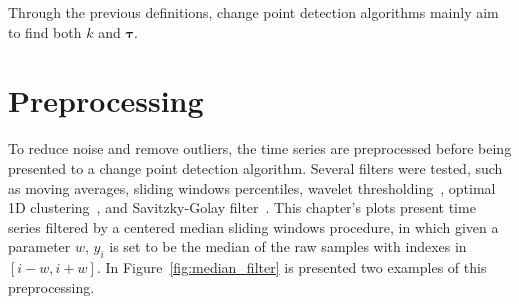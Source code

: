 Through the previous definitions, change point detection algorithms mainly aim
to find both $k$ and $\boldsymbol \tau$.

\section{Preprocessing}

To reduce noise and remove outliers, the time series are
preprocessed before being presented to a change point detection algorithm.
Several filters were tested, such as moving averages, sliding windows
percentiles,
wavelet thresholding~\cite{an_introduction_to_wavelets}, optimal 1D
clustering~\cite{ckmeans_1d_dp_optimal_k_means_clustering_in_one_dimension_by_dynamic_programming},
and Savitzky-Golay filter~\cite{savgol}.
This chapter's plots present time series filtered by a centered median
sliding windows procedure, in which given a parameter $w$, $y_{i}$ is set to be
the median of the raw samples with indexes in $[i-w, i+w]$. In
Figure~\ref{fig:median_filter} is presented two examples of this preprocessing.

